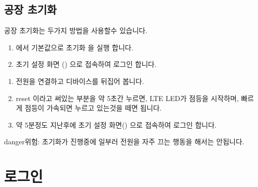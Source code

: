 \documentclass[letterpaper,10pt,english]{sphinxmanual}
\begin{document}
\subsection{공장 초기화}
\label{\detokenize{howto/device_manage:id6}}
\sphinxAtStartPar
공장 초기화는 두가지 방법을 사용할수 있습니다.

\sphinxAtStartPar
{}

\noindent{}
\begin{enumerate}
%
\item {} 
\sphinxAtStartPar
{} 에서  기본값으로 초기화  을 실행 합니다.

\item {} 
\sphinxAtStartPar
초기 설정 화면 () 으로 접속하여 로그인 합니다.

\end{enumerate}

\sphinxAtStartPar
{}
\begin{enumerate}
%
\item {} 
\sphinxAtStartPar
전원을 연결하고 디바이스를 뒤집어 봅니다.

\item {} 
\sphinxAtStartPar
reset 이라고 써있는 부분을 약 5초간 누르면, LTE LED가 점등을 시작하며, 빠르게 점등이 가속되면 누르고 있는것을 떼면 됩니다.

\item {} 
\sphinxAtStartPar
약 5분정도 지난후에 초기 설정 화면() 으로 접속하여 로그인 합니다.

\end{enumerate}

\begin{sphinxadmonition}{danger}{위험:}
\sphinxAtStartPar
초기화가 진행중에 일부러 전원을 자주 끄는 행동을 해서는 안됩니다.
\end{sphinxadmonition}

\sphinxstepscope


\section{로그인}
\label{\detokenize{main_menu/login:id1}}\label{\detokenize{main_menu/login::doc}}
\end{document}
